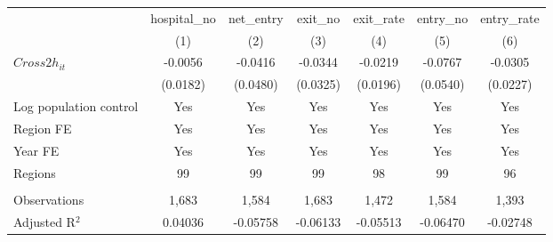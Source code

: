 \begingroup
\centering
\begin{tabular}{lcccccc}
   \toprule
                          & hospital\_no  & net\_entry  & exit\_no  & exit\_rate  & entry\_no  & entry\_rate \\    
                          & (1)           & (2)         & (3)       & (4)         & (5)        & (6)\\  
   \midrule 
   $Cross2h_{it}$         & -0.0056       & -0.0416     & -0.0344   & -0.0219     & -0.0767    & -0.0305\\   
                          & (0.0182)      & (0.0480)    & (0.0325)  & (0.0196)    & (0.0540)   & (0.0227)\\   
   Log population control & Yes           & Yes         & Yes       & Yes         & Yes        & Yes\\  
   Region FE              & Yes           & Yes         & Yes       & Yes         & Yes        & Yes\\  
   Year FE                & Yes           & Yes         & Yes       & Yes         & Yes        & Yes\\  
   Regions                & 99            & 99          & 99        & 98          & 99         & 96\\  
    \\
   Observations           & 1,683         & 1,584       & 1,683     & 1,472       & 1,584      & 1,393\\  
   Adjusted R$^2$         & 0.04036       & -0.05758    & -0.06133  & -0.05513    & -0.06470   & -0.02748\\  
   \bottomrule
\end{tabular}
\par\endgroup
